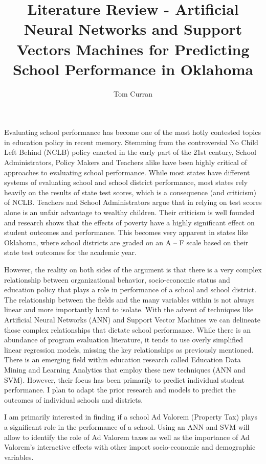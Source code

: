 \documentclass[]{article}
\title{Literature Review - Artificial Neural Networks and Support Vectors Machines for Predicting School Performance in Oklahoma}
\author{Tom Curran}
\begin{document}
\maketitle
	Evaluating school performance has become one of the most hotly contested topics in education policy in recent memory. Stemming from the controversial No Child Left Behind (NCLB) policy enacted in the early part of the 21st century, School Administrators, Policy Makers and Teachers alike have been highly critical of approaches to evaluating school performance. While most states have different systems of evaluating school and school district performance, most states rely heavily on the results of state test scores, which is a consequence (and criticism) of NCLB. Teachers and School Administrators argue that in relying on test scores alone is an unfair advantage to wealthy children. Their criticism is well founded and research shows that the effects of poverty have a highly significant effect on student outcomes and performance. This becomes very apparent in states like Oklahoma, where school districts are graded on an A – F scale based on their state test outcomes for the academic year. 

However, the reality on both sides of the argument is that there is a very complex relationship between organizational behavior, socio-economic status and education policy that plays a role in performance of a school and school district. The relationship between the fields and the many variables within is not always linear and more importantly hard to isolate. With the advent of techniques like Artificial Neural Networks (ANN) and Support Vector Machines we can delineate those complex relationships that dictate school performance. While there is an abundance of program evaluation literature, it tends to use overly simplified linear regression models, missing the key relationships as previously mentioned. There is an emerging field within education research called Education Data Mining and Learning Analytics that employ these new techniques (ANN and SVM). However, their focus has been primarily to predict individual student performance. I plan to adapt the prior research and models to predict the outcomes of individual schools and districts.

I am primarily interested in finding if a school Ad Valorem (Property Tax) plays a significant role in the performance of a school. Using an ANN and SVM will allow to identify the role of Ad Valorem taxes as well as the importance of Ad Valorem’s interactive effects with other import socio-economic and demographic variables. 
\end{document}
